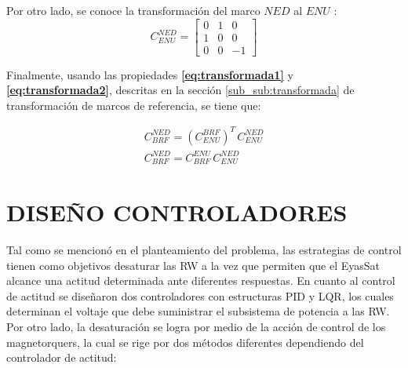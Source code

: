 Por otro lado, se conoce la transformación del marco $NED$ al $ENU$ :
$$
C_{ENU}^{NED}=\left[\begin{array}{ccc}
	0 &1 &0 \\
	1 & 0 & 0 \\
	0 & 0 &-1
\end{array}\right]
$$

Finalmente, usando las propiedades \textbf{\eqref{eq:transformada1}} y \textbf{\eqref{eq:transformada2}}, descritas en la sección \ref{sub_sub:transformada} de transformación de marcos de referencia, se tiene que:

\begin{gather}
	C_{BRF}^{NED} = \left(C_{ENU}^{BRF}\right)^T\,C_{ENU}^{NED}\\[10pt]
	C_{BRF}^{NED} = C_{BRF}^{ENU}\,C_{ENU}^{NED}
\end{gather}
	



\newpage
\section{DISEÑO CONTROLADORES}

Tal como se mencionó en el planteamiento del problema, las estrategias de control tienen como objetivos desaturar las RW a la vez que permiten que el EyasSat alcance una actitud determinada ante diferentes respuestas. En cuanto al control de actitud se diseñaron dos controladores con estructuras PID y LQR, los cuales determinan el voltaje que  debe suministrar el subsistema de potencia a las RW. Por otro lado, la desaturación se logra por medio de la acción de control de los magnetorquers, la cual se rige por dos métodos diferentes dependiendo del controlador de actitud:

